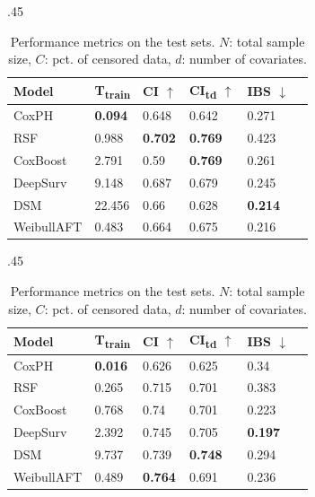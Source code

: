 \documentclass[letterpaper]{article} %
\begin{document}
\begin{table}[!htbp]
\begin{subtable}{.45\textwidth}
\begin{center}
\caption{XJTU ($N=1000$, $C=20\%$, $d=12$).}
\label{subtab:xjtu}
\begin{tabular}{llllll} %
    {Model} & {T\textsubscript{train}} & {CI $\uparrow$} & {CI\textsubscript{td} $\uparrow$} & {IBS $\downarrow$} \\ \midrule
    CoxPH & \textbf{0.094} & 0.648 & 0.642 & 0.271 \\
    RSF & 0.988 & \textbf{0.702} & \textbf{0.769} & 0.423 \\
    CoxBoost & 2.791 & 0.59 & \textbf{0.769} & 0.261\\
    DeepSurv & 9.148 & 0.687 & 0.679 & 0.245\\
    DSM & 22.456 & 0.66 & 0.628 & \textbf{0.214}\\
    WeibullAFT & 0.483 & 0.664 & 0.675 & 0.216\\ \bottomrule
\end{tabular}
\end{center}
\end{subtable}%

\begin{subtable}{.45\textwidth}
\begin{center}
\caption{PRONOSTIA ($N=400$, $C=20\%$, $d=12$).}
\label{subtab:pronostia}
\begin{tabular}{llllll} %
    {Model} & {T\textsubscript{train}} & {CI $\uparrow$} & {CI\textsubscript{td} $\uparrow$} & {IBS $\downarrow$} \\ \midrule
    CoxPH & \textbf{0.016} & 0.626 & 0.625 & 0.34 \\
    RSF & 0.265 & 0.715 & 0.701 & 0.383 \\
    CoxBoost & 0.768 & 0.74 & 0.701 & 0.223\\
    DeepSurv & 2.392 & 0.745 & 0.705 & \textbf{0.197}\\
    DSM & 9.737 & 0.739 & \textbf{0.748} & 0.294\\
    WeibullAFT & 0.489 & \textbf{0.764} & 0.691 & 0.236\\ \bottomrule
\end{tabular}
\end{center}
\end{subtable}
\caption{Performance metrics on the test sets. $N$: total sample size, $C$: pct. of censored data, $d$: number of covariates.}
\label{tab:results}
\end{table}

\clearpage

\end{document}
